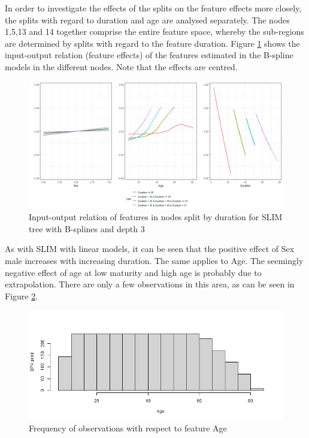 In order to investigate the effects of the splits on the feature effects more closely, the splits with regard to duration and age are analysed separately.
The nodes 1,5,13 and 14 together comprise the entire feature space, whereby the sub-regions are determined by splits with regard to the feature duration.
Figure \ref{fig:ins_k2204_effects_duration} shows the input-output relation (feature effects) of the features estimated in the B-spline models in the different nodes. Note that the effects are centred.

\begin{figure}[!htb]
    \centering
    \includegraphics[width = 16cm]{Figures/insurance_use_case/k2204_BPV/effects_duration.png}
    \caption{Input-output relation of features in nodes split by duration for SLIM tree with B-splines and depth 3}
    \label{fig:ins_k2204_effects_duration}
\end{figure}

As with SLIM with linear models, it can be seen that the positive effect of Sex male increases with increasing duration. The same applies to Age. The seemingly negative effect of age at low maturity and high age is probably due to extrapolation. There are only a few observations in this area, as can be seen in Figure \ref{fig:ins_k2204_hist_age}.

\begin{figure}[!htb]
    \centering
    \includegraphics[width = 12cm]{Figures/insurance_use_case/k2204_BPV/hist_age.png}
    \caption{Frequency of observations with respect to feature Age}
    \label{fig:ins_k2204_hist_age}
\end{figure}

